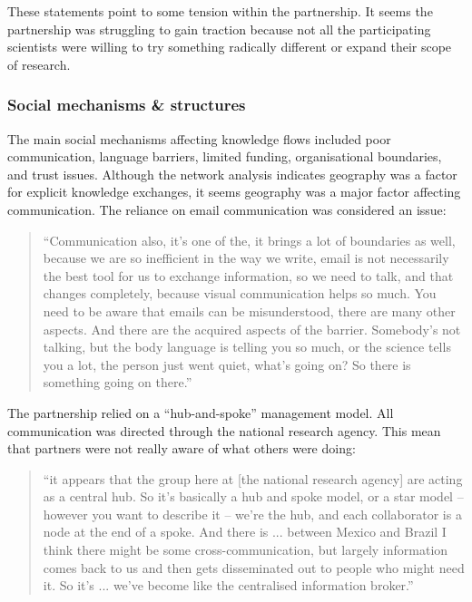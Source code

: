  These statements point to some tension within the partnership. It seems the partnership was struggling to gain traction because not all the participating scientists were willing to try something radically different or expand their scope of research.

\subsubsection{Social mechanisms \& structures}

The main social mechanisms affecting knowledge flows included poor communication, language barriers, limited funding, organisational boundaries, and trust issues. Although the network analysis indicates geography was a factor for explicit knowledge exchanges, it seems geography was a major factor affecting communication. The reliance on email communication was considered an issue:

\begin{quote}
\small
\enquote{Communication also, it's one of the, it brings a lot of boundaries as well, because we are so inefficient in the way we write, email is not necessarily the best tool for us to exchange information, so we need to talk, and that changes completely, because visual communication helps so much. You need to be aware that emails can be misunderstood, there are many other aspects. And there are the acquired aspects of the barrier. Somebody's not talking, but the body language is telling you so much, or the science tells you a lot, the person just went quiet, what's going on? So there is something going on there.} \\
\end{quote}

The partnership relied on a \enquote{hub-and-spoke} management model. All communication was directed through the national research agency. This mean that partners were not really aware of what others were doing:

\begin{quote}
\small
\enquote{it appears that the group here at [the national research agency] are acting as a central hub.  So it’s basically a hub and spoke model, or a star model – however you want to describe it – we're the hub, and each collaborator is a node at the end of a spoke.  And there is ... between Mexico and Brazil I think there might be some cross-communication, but largely information comes back to us and then gets disseminated out to people who might need it.  So it's ... we've become like the centralised information broker.} \\
\end{quote}

